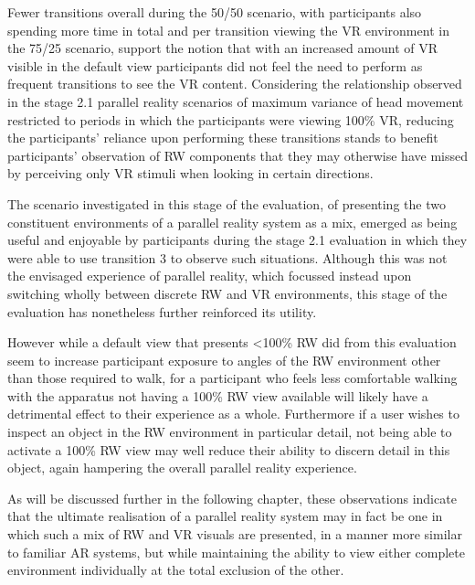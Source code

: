 Fewer transitions overall during the 50/50 scenario, with participants also spending more time in total and per transition viewing the VR environment in the 75/25 scenario, support the notion that with an increased amount of VR visible in the default view participants did not feel the need to perform as frequent transitions to see the VR content. Considering the relationship observed in the stage 2.1 parallel reality scenarios of maximum variance of head movement restricted to periods in which the participants were viewing 100\% VR, reducing the participants' reliance upon performing these transitions stands to benefit participants' observation of RW components that they may otherwise have missed by perceiving only VR stimuli when looking in certain directions.

The scenario investigated in this stage of the evaluation, of presenting the two constituent environments of a parallel reality system as a mix, emerged as being useful and enjoyable by participants during the stage 2.1 evaluation in which they were able to use transition 3 to observe such situations. Although this was not the envisaged experience of parallel reality, which focussed instead upon switching wholly between discrete RW and VR environments, this stage of the evaluation has nonetheless further reinforced its utility.

However while a default view that presents \textless 100\% RW did from this evaluation seem to increase participant exposure to angles of the RW environment other than those required to walk, for a participant who feels less comfortable walking with the apparatus not having a 100\% RW view available will likely have a detrimental effect to their experience as a whole. Furthermore if a user wishes to inspect an object in the RW environment in particular detail, not being able to activate a 100\% RW view may well reduce their ability to discern detail in this object, again hampering the overall parallel reality experience.

As will be discussed further in the following chapter, these observations indicate that the ultimate realisation of a parallel reality system may in fact be one in which such a mix of RW and VR visuals are presented, in a manner more similar to familiar AR systems, but while maintaining the ability to view either complete environment individually at the total exclusion of the other.


